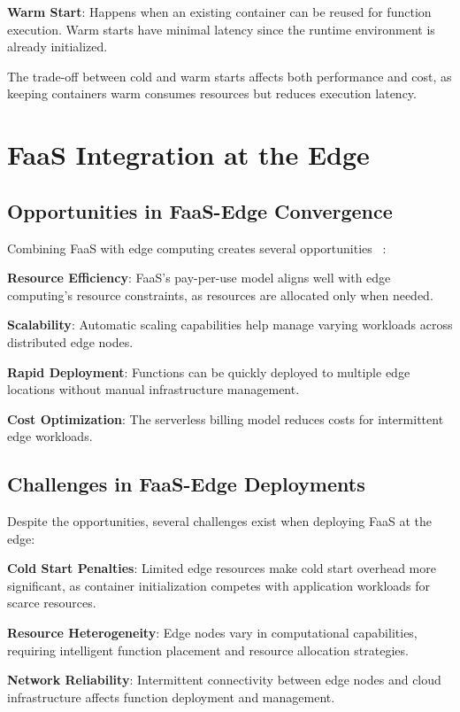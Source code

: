 \textbf{Warm Start}: Happens when an existing container can be reused for function execution. Warm starts have minimal latency since the runtime environment is already initialized.

The trade-off between cold and warm starts affects both performance and cost, as keeping containers warm consumes resources but reduces execution latency.

\section{FaaS Integration at the Edge}

\subsection{Opportunities in FaaS-Edge Convergence}

Combining FaaS with edge computing creates several opportunities ~\cite{aslanpour2021serverless}:

\textbf{Resource Efficiency}: FaaS's pay-per-use model aligns well with edge computing's resource constraints, as resources are allocated only when needed.

\textbf{Scalability}: Automatic scaling capabilities help manage varying workloads across distributed edge nodes.

\textbf{Rapid Deployment}: Functions can be quickly deployed to multiple edge locations without manual infrastructure management.

\textbf{Cost Optimization}: The serverless billing model reduces costs for intermittent edge workloads.

\subsection{Challenges in FaaS-Edge Deployments}

Despite the opportunities, several challenges exist when deploying FaaS at the edge:

\textbf{Cold Start Penalties}: Limited edge resources make cold start overhead more significant, as container initialization competes with application workloads for scarce resources.

\textbf{Resource Heterogeneity}: Edge nodes vary in computational capabilities, requiring intelligent function placement and resource allocation strategies.

\textbf{Network Reliability}: Intermittent connectivity between edge nodes and cloud infrastructure affects function deployment and management.

